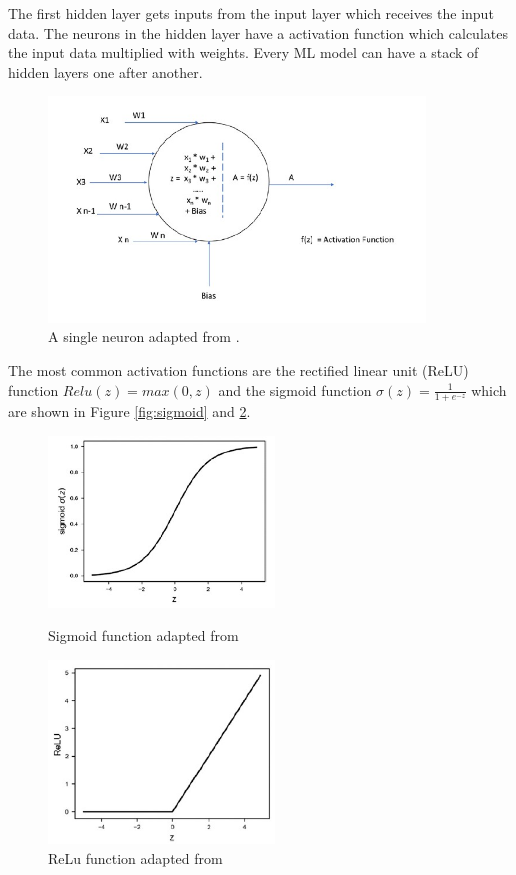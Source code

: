 The first hidden layer gets inputs from the input layer which receives the input data. The neurons in the hidden layer have a activation function which calculates the input data multiplied with weights.
Every ML model can have a stack of hidden layers one after another.

\begin{figure}[ht!]
  \centering
  \includegraphics[width=10cm]{pictures/single_neuron.jpg}
  \caption{A single neuron adapted from \cite{moolayil_2019}.}
  \label{fig:single_neuron}
\end{figure}

The most common activation functions \cite{DBLP:conf/bmvc/Misra20} are the rectified linear unit (ReLU) function $Relu(z) = max(0, z)$ and the sigmoid function $\sigma(z) = \frac{1} {1 + e^{-z}}$ which are shown in Figure \ref{fig:sigmoid} and \ref{fig:relu}.

\begin{figure}[ht!]
  \centering
  \begin{minipage}[b]{0.4\textwidth}
    \includegraphics[width=6cm]{pictures/sigmoid.jpg}
    \caption{Sigmoid function adapted from \cite{moolayil_2019}}
    \label{fig:sigmoid}
  \end{minipage}
  \hfill
  \begin{minipage}[b]{0.4\textwidth}
    \includegraphics[width=6cm]{pictures/relu.jpg}
    \caption{ReLu function adapted from \cite{moolayil_2019}}
    \label{fig:relu}
  \end{minipage}
\end{figure}

